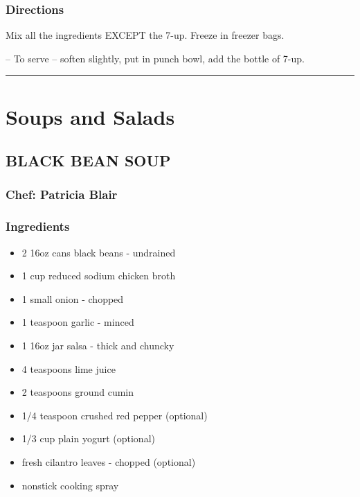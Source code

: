 \documentclass[
]{book}
\providecommand{\tightlist}{%
  \setlength{\itemsep}{0pt}\setlength{\parskip}{0pt}}
\begin{document}
\hypertarget{directions-12}{%
\subsection*{Directions}\label{directions-12}}


Mix all the ingredients EXCEPT the 7-up. Freeze in freezer bags.

-- To serve -- soften slightly, put in punch bowl, add the bottle of 7-up.

\begin{center}\rule{0.5\linewidth}{0.5pt}\end{center}

\hypertarget{salad}{%
\chapter{Soups and Salads}\label{salad}}

\hypertarget{black-bean-soup}{%
\section*{BLACK BEAN SOUP}\label{black-bean-soup}}


\hypertarget{chef-patricia-blair-5}{%
\subsection*{Chef: Patricia Blair}\label{chef-patricia-blair-5}}


\hypertarget{ingredients-13}{%
\subsection*{Ingredients}\label{ingredients-13}}


\begin{itemize}
\tightlist
\item
  2 16oz cans black beans - undrained
\item
  1 cup reduced sodium chicken broth
\item
  1 small onion - chopped
\item
  1 teaspoon garlic - minced
\item
  1 16oz jar salsa - thick and chuncky
\item
  4 teaspoons lime juice
\item
  2 teaspoons ground cumin
\item
  1/4 teaspoon crushed red pepper (optional)
\item
  1/3 cup plain yogurt (optional)
\item
  fresh cilantro leaves - chopped (optional)
\item
  nonstick cooking spray
\end{itemize}
\end{document}
